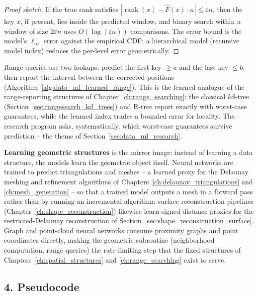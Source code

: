 \begin{proof}[Proof sketch]
  If the true rank satisfies
  $|\operatorname{rank}(x) - \hat{F}(x) \cdot n| \leq \varepsilon n$, then
  the key $x$, if present, lies inside the predicted window, and binary
  search within a window of size $2 \varepsilon n$ uses
  $O(\log(\varepsilon n))$ comparisons. The error bound is the model's
  $\ell_\infty$ error against the empirical CDF; a hierarchical model
  (recursive model index) reduces the per-level error geometrically.
\end{proof}

\begin{remark}
  Range queries use two lookups: predict the first key $\geq a$ and the
  last key $\leq b$, then report the interval between the corrected
  positions (Algorithm~\ref{alg:data_ml_learned_range}). This is the
  learned analogue of the range-reporting structures of
  Chapter~\ref{ch:range_searching}: the classical $k$d-tree
  (Section~\ref{sec:rangesearch_kd_trees}) and R-tree report exactly with
  worst-case guarantees, while the learned index trades a bounded error
  for locality. The research program asks, systematically, which
  worst-case guarantees survive prediction -- the theme of
  Section~\ref{sec:data_ml_research}.
\end{remark}

\textbf{Learning geometric structures} is the mirror image: instead of
learning a data structure, the models learn the geometric object itself.
Neural networks are trained to predict triangulations and meshes -- a
learned proxy for the Delaunay meshing and refinement algorithms of
Chapters~\ref{ch:delaunay_triangulations} and \ref{ch:mesh_generation} --
so that a trained model outputs a mesh in a forward pass rather than by
running an incremental algorithm; surface reconstruction pipelines
(Chapter~\ref{ch:shape_reconstruction}) likewise learn signed-distance
proxies for the restricted-Delaunay reconstruction of
Section~\ref{sec:shape_reconstruction_surface}. Graph and point-cloud
neural networks consume proximity graphs and point coordinates directly,
making the geometric subroutine (neighborhood computation, range queries)
the rate-limiting step that the fixed structures of
Chapters~\ref{ch:spatial_structures} and \ref{ch:range_searching} exist to
serve.

\subsection{4. Pseudocode}

